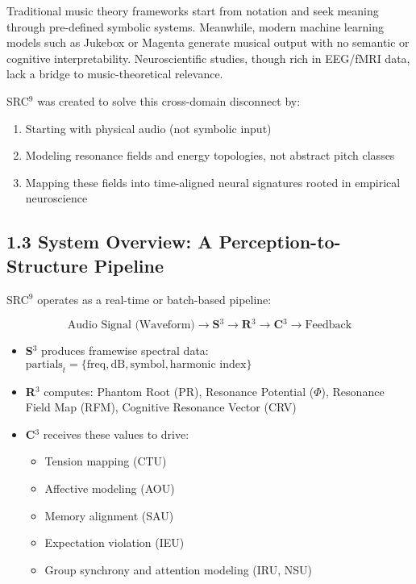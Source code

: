 Traditional music theory frameworks start from notation and seek meaning through pre-defined symbolic systems. Meanwhile, modern machine learning models such as Jukebox or Magenta generate musical output with no semantic or cognitive interpretability. Neuroscientific studies, though rich in EEG/fMRI data, lack a bridge to music-theoretical relevance.

SRC$^{9}$ was created to solve this cross-domain disconnect by:

\begin{enumerate}
    \item Starting with physical audio (not symbolic input)
    \item Modeling resonance fields and energy topologies, not abstract pitch classes
    \item Mapping these fields into time-aligned neural signatures rooted in empirical neuroscience
\end{enumerate}

\subsection*{1.3 System Overview: A Perception-to-Structure Pipeline}

SRC$^{9}$ operates as a real-time or batch-based pipeline:

\[
\text{Audio Signal (Waveform)} 
\rightarrow \textbf{S$^{3}$} \rightarrow \textbf{R$^{3}$} \rightarrow \textbf{C$^{3}$} 
\rightarrow \text{Feedback}
\]

\begin{itemize}
    \item \textbf{S$^{3}$} produces framewise spectral data: $\text{partials}_t = \{\text{freq}, \text{dB}, \text{symbol}, \text{harmonic index}\}$
    \item \textbf{R$^{3}$} computes: Phantom Root (PR), Resonance Potential ($\Phi$), Resonance Field Map (RFM), Cognitive Resonance Vector (CRV)
    \item \textbf{C$^{3}$} receives these values to drive:
    \begin{itemize}
        \item Tension mapping (CTU)
        \item Affective modeling (AOU)
        \item Memory alignment (SAU)
        \item Expectation violation (IEU)
        \item Group synchrony and attention modeling (IRU, NSU)
    \end{itemize}
\end{itemize}

